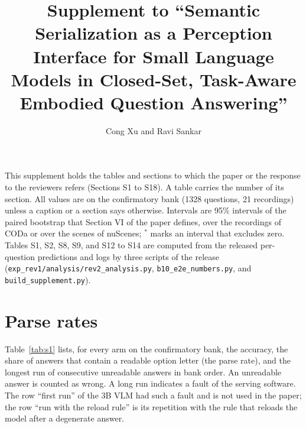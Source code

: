 \documentclass[10pt]{article}
\title{Supplement to ``Semantic Serialization as a Perception Interface for Small Language Models in Closed-Set, Task-Aware Embodied Question Answering''}
\author{Cong Xu and Ravi Sankar}
\date{}
\begin{document}
\maketitle
This supplement holds the tables and sections to which the paper or the response to the reviewers refers (Sections S1 to S18). A table carries the number of its section. All values are on the confirmatory bank (1328 questions, 21 recordings) unless a caption or a section says otherwise. Intervals are 95\% intervals of the paired bootstrap that Section VI of the paper defines, over the recordings of CODa or over the scenes of nuScenes; $^{*}$ marks an interval that excludes zero. Tables S1, S2, S8, S9, and S12 to S14 are computed from the released per-question predictions and logs by three scripts of the release (\texttt{exp\_rev1/analysis/rev2\_analysis.py}, \texttt{b10\_e2e\_numbers.py}, and \texttt{build\_supplement.py}).

\section{Parse rates}
Table~\ref{tab:s1} lists, for every arm on the confirmatory bank, the accuracy, the share of answers that contain a readable option letter (the parse rate), and the longest run of consecutive unreadable answers in bank order. An unreadable answer is counted as wrong. A long run indicates a fault of the serving software. The row ``first run'' of the 3B VLM had such a fault and is not used in the paper; the row ``run with the reload rule'' is its repetition with the rule that reloads the model after a degenerate answer.
\end{document}
